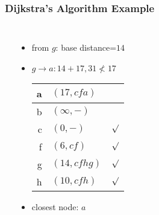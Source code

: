 \documentclass[dvipsnames]{beamer}
\begin{document}
\begin{frame}
  \frametitle{Dijkstra's Algorithm Example}

  \begin{columns}
    \begin{center}
    \end{center}

    \begin{itemize}
      \item from $g$: base distance=$14$
      \item $g \rightarrow a: 14+17, 31 \nless 17$

      \pause
      \begin{table}
        \begin{tabular}{r|l|c}
          a & $(17,cfa)$   & \\\hline
          b & $(\infty,-)$ & \\\hline
          c & $(0,-)$      & $\surd$ \\\hline
          f & $(6,cf)$     & $\surd$ \\\hline
          g & $(14,cfhg)$  & $\surd$ \\\hline
          h & $(10,cfh)$   & $\surd$
        \end{tabular}
      \end{table}

      \pause
      \item closest node: $a$
    \end{itemize}
  \end{columns}
\end{frame}
\end{document}
